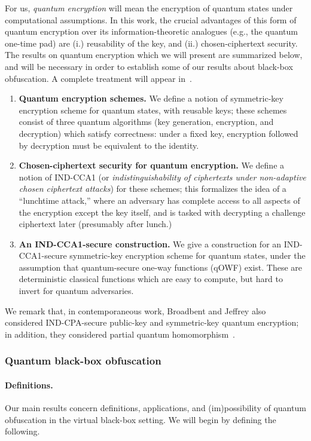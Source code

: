 \documentclass[11pt]{article}
\numberwithin{equation}{section}
\begin{document}
{For us, \emph{quantum encryption} will mean the encryption of quantum states under computational assumptions. In this work, the crucial advantages of this form of quantum encryption over its information-theoretic analogues (e.g., the quantum one-time pad) are (i.) reusability of the key, and (ii.) chosen-ciphertext security. The results on quantum encryption which we will present are summarized below, and will be necessary in order to establish some of our results about black-box obfuscation. A complete treatment will appear in~\cite{ABFGSS15}.
\begin{enumerate}
\item \textbf{Quantum encryption schemes.} We define a notion of symmetric-key encryption scheme for quantum states, with reusable keys; these schemes consist of three quantum algorithms (key generation, encryption, and decryption) which satisfy correctness: under a fixed key, encryption followed by decryption must be equivalent to the identity.
\item \textbf{Chosen-ciphertext security for quantum encryption.} We define a notion of IND-CCA1 (or \emph{indistinguishability of ciphertexts under non-adaptive chosen ciphertext attacks}) for these schemes; this formalizes the idea of a ``lunchtime attack,'' where an adversary has complete access to all aspects of the encryption except the key itself, and is tasked with decrypting a challenge ciphertext later (presumably after lunch.)
\item \textbf{An IND-CCA1-secure construction.} We give a construction for an IND-CCA1-secure symmetric-key encryption scheme for quantum states, under the assumption that quantum-secure one-way functions (qOWF) exist. These are deterministic classical functions which are easy to compute, but hard to invert for quantum adversaries.
\end{enumerate}
We remark that, in contemporaneous work, Broadbent and Jeffrey also considered IND-CPA-secure public-key and symmetric-key quantum encryption; in addition, they considered partial quantum homomorphism~\cite{BJ15}. 

\subsubsection{Quantum black-box obfuscation}

\paragraph{Definitions.} Our main results concern definitions, applications, and (im)possibility of quantum obfuscation in the virtual black-box setting. We will begin by defining the following.

}
\end{document}
